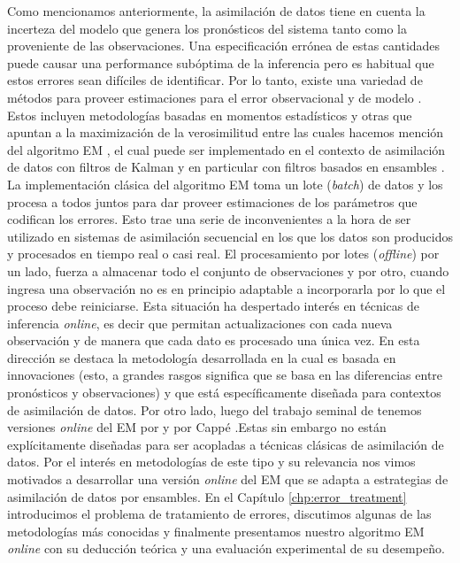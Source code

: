 Como mencionamos anteriormente, la asimilación de datos tiene en cuenta la incerteza del modelo que genera los pronósticos del sistema tanto como la proveniente de las observaciones. Una especificación errónea de estas cantidades puede causar una performance subóptima de la inferencia pero es habitual que estos errores sean difíciles de identificar. Por lo tanto, existe una variedad de métodos para proveer estimaciones para el error observacional y de modelo \citep{Tandeo2020}. Estos incluyen metodologías basadas en momentos estadísticos y otras que apuntan a la maximización de la verosimilitud entre las cuales hacemos mención del algoritmo EM \citep{Dempster1977}, el cual puede ser implementado en el contexto de asimilación de datos con filtros de Kalman y en particular con filtros basados en ensambles \citep{Tandeo2015}. La implementación clásica del algoritmo EM toma un lote (\textit{batch}) de datos y los procesa a todos juntos para dar proveer estimaciones de los parámetros que codifican los errores. Esto trae una serie de inconvenientes a la hora de ser utilizado en sistemas de asimilación secuencial en los que los datos son producidos y procesados en tiempo real o casi real. El procesamiento por lotes (\textit{offline}) por un lado, fuerza a almacenar todo el conjunto de observaciones y por otro, cuando ingresa una observación no es en principio adaptable a incorporarla por lo que el proceso debe reiniciarse. Esta situación ha despertado interés en técnicas de inferencia \textit{online}, es decir que permitan actualizaciones con cada nueva observación y de manera que cada dato es procesado una única vez. En esta dirección se destaca la metodología desarrollada en \cite{Berry2013} la cual es basada en innovaciones (esto, a grandes rasgos significa que se basa en las diferencias entre pronósticos y observaciones) y que está específicamente diseñada para contextos de asimilación de datos. Por otro lado, luego del trabajo seminal de \cite{Neal1998} tenemos versiones \textit{online} del EM por \cite{Andrieu2003} y por Cappé \citep{Cappe2009,Cappe2011}.Estas sin embargo no están explícitamente diseñadas para ser acopladas a técnicas clásicas de asimilación de datos. Por el interés en metodologías de este tipo y su relevancia nos vimos motivados a desarrollar una versión \textit{online} del EM que se adapta a estrategias de asimilación de datos por ensambles. En el Capítulo \ref{chp:error_treatment} introducimos el problema de tratamiento de errores, discutimos algunas de las metodologías más conocidas y finalmente presentamos nuestro algoritmo EM \textit{online} con su deducción teórica y una evaluación experimental de su desempeño.

